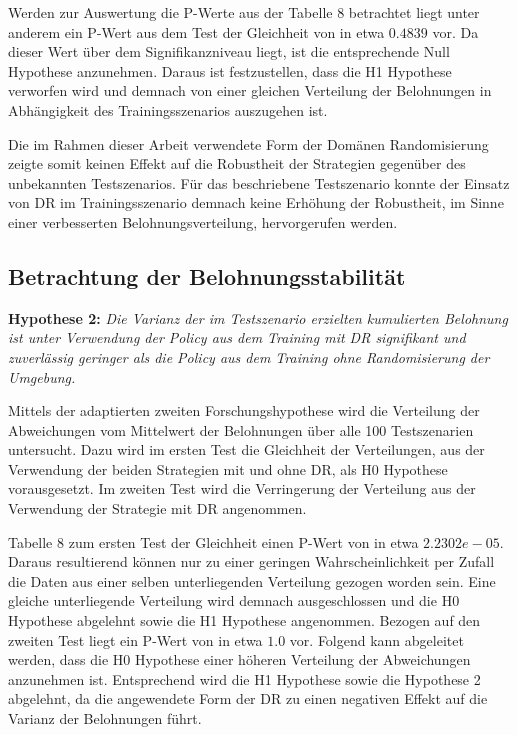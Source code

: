 Werden zur Auswertung die P-Werte aus der Tabelle 8 betrachtet liegt unter anderem ein P-Wert aus dem Test der Gleichheit von in etwa $0.4839$ vor.
Da dieser Wert über dem Signifikanzniveau liegt, ist die entsprechende Null Hypothese anzunehmen.
Daraus ist festzustellen, dass die H1 Hypothese verworfen wird und demnach von einer gleichen Verteilung der Belohnungen in Abhängigkeit des Trainingsszenarios auszugehen ist.

Die im Rahmen dieser Arbeit verwendete Form der Domänen Randomisierung zeigte somit keinen Effekt auf die Robustheit der Strategien gegenüber des unbekannten Testszenarios.
Für das beschriebene Testszenario konnte der Einsatz von DR im Trainingsszenario demnach keine Erhöhung der Robustheit, im Sinne einer verbesserten Belohnungsverteilung, hervorgerufen werden.

\subsection{Betrachtung der Belohnungsstabilität}

\textbf{Hypothese 2:}
\textit{Die Varianz der im Testszenario erzielten kumulierten Belohnung ist unter Verwendung der Policy aus dem Training mit DR signifikant und zuverlässig geringer als die Policy aus dem Training ohne Randomisierung der Umgebung.}

Mittels der adaptierten zweiten Forschungshypothese wird die Verteilung der Abweichungen vom Mittelwert der Belohnungen über alle 100 Testszenarien untersucht.
Dazu wird im ersten Test die Gleichheit der Verteilungen, aus der Verwendung der beiden Strategien mit und ohne DR, als H0 Hypothese vorausgesetzt.
Im zweiten Test wird die Verringerung der Verteilung aus der Verwendung der Strategie mit DR angenommen.

Tabelle 8 zum ersten Test der Gleichheit einen P-Wert von in etwa $2.2302e-05$.
Daraus resultierend können nur zu einer geringen Wahrscheinlichkeit per Zufall die Daten aus einer selben unterliegenden Verteilung gezogen worden sein.
Eine gleiche unterliegende Verteilung wird demnach ausgeschlossen und die H0 Hypothese abgelehnt sowie die H1 Hypothese angenommen.
Bezogen auf den zweiten Test liegt ein P-Wert von in etwa $1.0$ vor.
Folgend kann abgeleitet werden, dass die H0 Hypothese einer höheren Verteilung der Abweichungen anzunehmen ist.
Entsprechend wird die H1 Hypothese sowie die Hypothese 2 abgelehnt, da die angewendete Form der DR zu einen negativen Effekt auf die Varianz der Belohnungen führt.

